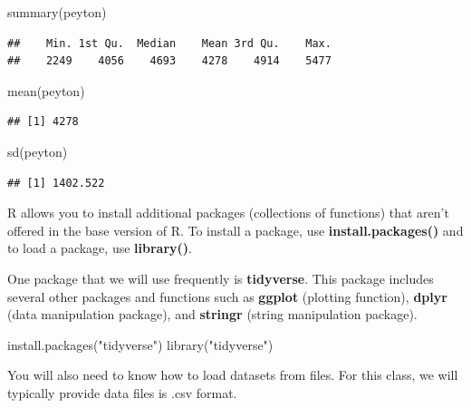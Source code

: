\documentclass[
  11pt,
]{book}
\newenvironment{Shaded}{\begin{snugshade}}{\end{snugshade}}
\newcommand{\FunctionTok}[1]{\textcolor[rgb]{0.00,0.00,0.00}{#1}}
\newcommand{\NormalTok}[1]{#1}
\newcommand{\StringTok}[1]{\textcolor[rgb]{0.31,0.60,0.02}{#1}}
\theoremstyle{definition}
\theoremstyle{definition}
\theoremstyle{definition}
\theoremstyle{definition}
\theoremstyle{remark}
\begin{document}
\begin{Shaded}
\begin{Highlighting}[]
\FunctionTok{summary}\NormalTok{(peyton)}
\end{Highlighting}
\end{Shaded}

\begin{verbatim}
##    Min. 1st Qu.  Median    Mean 3rd Qu.    Max. 
##    2249    4056    4693    4278    4914    5477
\end{verbatim}

\begin{Shaded}
\begin{Highlighting}[]
\FunctionTok{mean}\NormalTok{(peyton)}
\end{Highlighting}
\end{Shaded}

\begin{verbatim}
## [1] 4278
\end{verbatim}

\begin{Shaded}
\begin{Highlighting}[]
\FunctionTok{sd}\NormalTok{(peyton)}
\end{Highlighting}
\end{Shaded}

\begin{verbatim}
## [1] 1402.522
\end{verbatim}

R allows you to install additional packages (collections of functions) that aren't offered in the base version of R. To install a package, use \textbf{install.packages()} and to load a package, use \textbf{library()}.

One package that we will use frequently is \textbf{tidyverse}. This package includes several other packages and functions such as \textbf{ggplot} (plotting function), \textbf{dplyr} (data manipulation package), and \textbf{stringr} (string manipulation package).

\begin{Shaded}
\begin{Highlighting}[]
\FunctionTok{install.packages}\NormalTok{(}\StringTok{"tidyverse"}\NormalTok{)}
\FunctionTok{library}\NormalTok{(}\StringTok{"tidyverse"}\NormalTok{)}
\end{Highlighting}
\end{Shaded}

You will also need to know how to load datasets from files. For this class, we will typically provide data files is .csv format.
\end{document}
